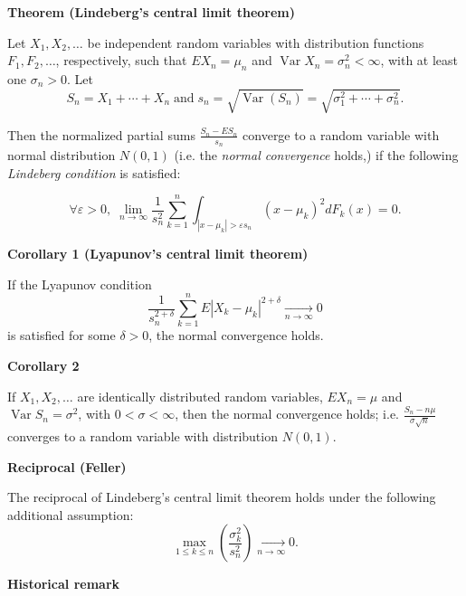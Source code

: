 \documentclass[12pt]{article}
\begin{document}
\textbf{Theorem (Lindeberg's central limit theorem)}

Let $X_1, X_2,\dots$ be independent random variables with distribution functions $F_1,F_2,\dots$, respectively, such that $EX_n=\mu_n$ and $\operatorname{Var}X_n=\sigma_n^2<\infty$, with at least one $\sigma_n>0$.
Let \[S_n = X_1+\cdots+X_n\;\mbox{and}\; s_n=\sqrt{\operatorname{Var}(S_n)} =
\sqrt{\sigma_1^2+\cdots+\sigma_n^2}.\]

Then the normalized partial sums $\frac{S_n - ES_n}{s_n}$ converge 
 to a random variable with normal distribution $N(0,1)$ (i.e. the \emph{normal convergence} holds,) if the following \emph{Lindeberg condition} is satisfied:

\[\forall \varepsilon>0,\; \lim_{n\rightarrow\infty} \frac{1}{s_n^2}
\sum_{k=1}^n \int_{|x-\mu_k|>\varepsilon s_n} (x-\mu_k)^2 dF_k(x) = 0.\]

\textbf{Corollary 1 (Lyapunov's central limit theorem)}

If the Lyapunov condition 
\[\frac{1}{s_n^{2+\delta}}\sum_{k=1}^n E|X_k-\mu_k|^{2+\delta} 
\xrightarrow[n\rightarrow\infty]{} 0\]
is satisfied for some $\delta>0$, the normal convergence holds.

\textbf{Corollary 2} 

If $X_1,X_2,\dots$ are identically distributed random variables, $EX_n=\mu$ and $\operatorname{Var}S_n = \sigma^2$, with $0<\sigma<\infty$, then the normal convergence holds; i.e. $\frac{S_n-n\mu}{\sigma \sqrt{n}}$ converges  to a random variable with distribution $N(0,1)$.

\textbf{Reciprocal (Feller)} 

The reciprocal of Lindeberg's central limit theorem holds under the following additional assumption:
\[\max_{1\leq k\leq n} \left(\frac{\sigma_k^2}{s_n^2}\right)\xrightarrow[n\rightarrow\infty]{} 0.\]

\textbf{Historical remark} 
\end{document}
